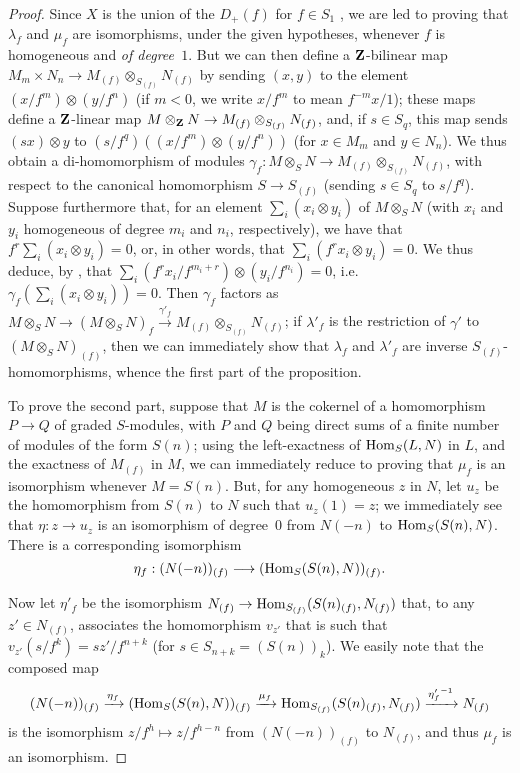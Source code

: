 \begin{proof}
Since $X$ is the union of the $D_+(f)$ for $f\in S_1$ , we are led to proving that $\lambda_f$ and $\mu_f$ are isomorphisms, under the given hypotheses, whenever $f$ is homogeneous and \emph{of degree~$1$}.
But we can then define a $\mathbf{Z}$-bilinear map $M_m\times N_n\to M_{(f)}\otimes_{S_{(f)}}N_{(f)}$ by sending $(x,y)$ to the element $(x/f^m)\otimes(y/f^n)$ (if $m<0$, we write $x/f^m$ to mean $f^{-m}x/1$);
these maps define a $\mathbf{Z}$-linear map $M\otimes_{\bb{Z}}N\to M_{(f)}\otimes_{S_{(f)}}N_{(f)}$, and, if $s\in S_q$, this map sends $(sx)\otimes y$ to $(s/f^q)((x/f^m)\otimes(y/f^n))$ (for $x\in M_m$ and $y\in N_n$).
We thus obtain a di-homomorphism of modules $\gamma_f: M\otimes_S N\to M_{(f)}\otimes_{S_{(f)}}N_{(f)}$, with respect to the canonical homomorphism $S\to S_{(f)}$ (sending $s\in S_q$ to $s/f^q$).
Suppose furthermore that, for an element $\sum_i(x_i\otimes y_i)$ of $M\otimes_S N$ (with $x_i$ and $y_i$ homogeneous of degree $m_i$ and $n_i$, respectively), we have that $f^r\sum_i(x_i\otimes y_i)=0$, or, in other words, that $\sum_i(f^rx_i\otimes y_i)=0$.
We thus deduce, by , that $\sum_i(f^rx_i/f^{m_i+r})\otimes(y_i/f^{n_i})=0$, i.e. $\gamma_f(\sum_i(x_i\otimes y_i))=0$.
Then $\gamma_f$ factors as $M\otimes_S N\to(M\otimes_S N)_f\xrightarrow{\gamma'_f}M_{(f)}\otimes_{S_{(f)}}N_{(f)}$;
if $\lambda'_f$ is the restriction of $\gamma'$
to $(M\otimes_S N)_{(f)}$, then we can immediately show that $\lambda_f$ and $\lambda'_f$ are inverse $S_{(f)}$-homomorphisms, whence the first part of the proposition.

To prove the second part, suppose that $M$ is the cokernel of a homomorphism $P\to Q$ of graded $S$-modules, with $P$ and $Q$ being direct sums of a finite number of modules of the form $S(n)$;
using the left-exactness of $\operatorname{Hom}_S(L,N)$ in $L$, and the exactness of $M_{(f)}$ in $M$, we can immediately reduce to proving that $\mu_f$ is an isomorphism whenever $M=S(n)$.
But, for any homogeneous $z$ in $N$, let $u_z$ be the homomorphism from $S(n)$ to $N$ such that $u_z(1)=z$;
we immediately see that $\eta: z\to u_z$ is an isomorphism of degree~$0$ from $N(-n)$ to $\operatorname{Hom}_S(S(n),N)$.
There is a corresponding isomorphism
\[
  \eta_f: (N(-n))_{(f)} \to (\Hom_S(S(n),N))_{(f)}.
\]

Now let $\eta'_f$ be the isomorphism $N_{(f)}\to\Hom_{S_{(f)}}(S(n)_{(f)},N_{(f)})$ that, to any $z'\in N_{(f)}$, associates the homomorphism $v_{z'}$ that is such that $v_{z'}(s/f^k)=sz'/f^{n+k}$ (for $s\in S_{n+k}=(S(n))_k$).
We easily note that the composed map
\[
  (N(-n))_{(f)}
  \xrightarrow{\eta_f} (\operatorname{Hom}_S(S(n),N))_{(f)}
  \xrightarrow{\mu_f} \operatorname{Hom}_{S_{(f)}}(S(n)_{(f)},N_{(f)})
  \xrightarrow{{\eta'_f}^{-1}} N_{(f)}
\]
is the isomorphism $z/f^h\mapsto z/f^{h-n}$ from $(N(-n))_{(f)}$ to $N_{(f)}$, and thus $\mu_f$ is an isomorphism.
\end{proof}

